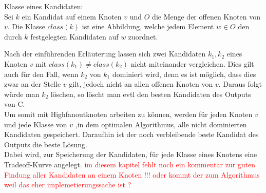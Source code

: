 \documentclass[11pt, a4paper, german]{article}
\begin{document}
\begin{definition}{Klasse eines Kandidaten:}\\
	Sei $k$ ein Kandidat auf einem Knoten $v$ und $O$ die Menge der offenen Knoten von $v$. Die Klasse $class(k)$ ist eine Abbildung, welche jedem Element $w \in O$ den durch $k$ festgelegten Kandidaten auf $w$ zuordnet.\\
\end{definition}
Nach der einführenden Erläuterung lassen sich zwei Kandidaten $k_1,k_2$ eines Knoten $v$ mit $class(k_1) \neq class(k_2)$ nicht miteinander vergleichen. Dies gilt auch für den Fall, wenn $k_2$ von  $k_1$ dominiert wird, denn es ist möglich, dass dies zwar an der Stelle $v$ gilt, jedoch nicht an allen offenen Knoten von $v$. Daraus folgt würde man $k_2$ löschen, so löscht man evtl den besten Kandidaten des Outputs von C. \\
Um somit mit Highfanoutknoten arbeiten zu können, werden für jeden Knoten $v$ und jede Klasse von $v$ ,in dem optimalen Algorithmus, alle nicht dominierten Kandidaten gespeichert. Daraufhin ist der noch verbleibende beste Kandidat des Outputs die beste Lösung.\\
Dabei wird, zur Speicherung der Kandidaten, für jede Klasse eines Knotens eine Tradeoff-Kurve angelegt.
\textcolor{red}{im diesem kapitel fehlt noch ein kommentar zur guten Findung aller Kandidaten an einem Knoten !!! oder kommt der zum Algorithmus weil das eher implemetierungssache ist ?}
\end{document}
